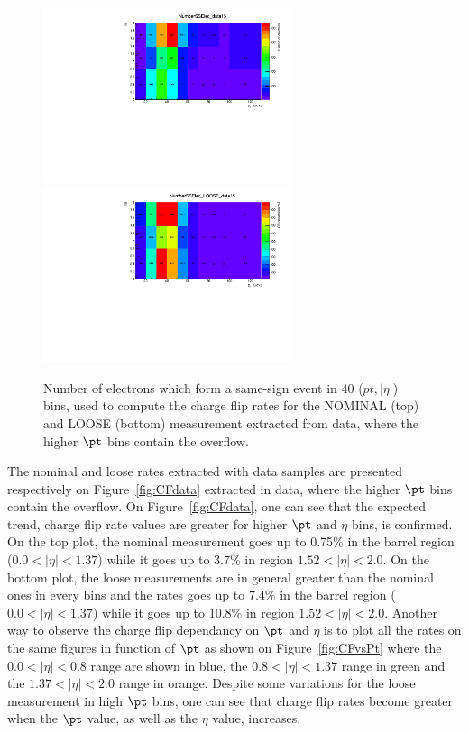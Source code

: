 \begin{figure}[!htb]
\centering
\includegraphics[width=0.65\textwidth]{FIGURES/BKG/chargeFlip/2D_histo_NumberSSElec_data15.pdf}
\includegraphics[width=0.65\textwidth]{FIGURES/BKG/chargeFlip/2D_histo_NumberSSElec_LOOSE_data15.pdf}
\caption{\label{fig:NSSdata} Number of electrons which form a same-sign event in 40 ($pt , | \eta | $) bins, used to compute the charge flip rates for the NOMINAL (top) and LOOSE (bottom) measurement  extracted from data, where the higher $\pt$ bins contain the overflow.}
\end{figure}

The nominal and loose rates extracted with data samples are presented respectively on Figure~\ref{fig:CFdata} extracted in data, where the higher $\pt$ bins contain the overflow. On Figure~\ref{fig:CFdata}, one can see that the expected trend, charge flip rate values are greater for higher $\pt$ and $\eta$ bins, is confirmed. On the top plot, the nominal measurement goes up to 0.75\% in the barrel region ($0.0<|\eta|<1.37$) while it goes up to 3.7\% in region $1.52<|\eta|<2.0$. On the bottom plot, the loose measurements are in general greater than the nominal ones in every bins and the rates goes up to 7.4\% in the barrel region ($0.0<|\eta|<1.37$) while it goes up to 10.8\% in region $1.52<|\eta|<2.0$. Another way to observe the charge flip dependancy on $\pt$ and $\eta$ is to plot all the rates on the same figures in function of $\pt$ as shown on Figure~\ref{fig:CFvsPt} where the $0.0<|\eta|<0.8$ range are shown in blue, the $0.8<|\eta|<1.37$ range in green and the $1.37<|\eta|<2.0$ range in orange. Despite some variations for the loose measurement in high $\pt$ bins, one can see that charge flip rates become greater when the $\pt$ value, as well as the $\eta$ value, increases.

